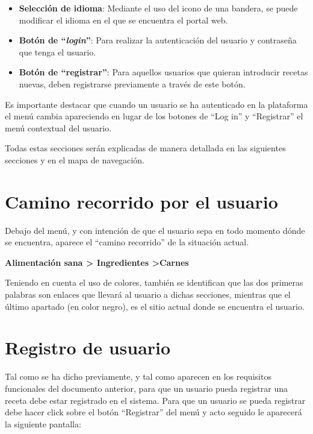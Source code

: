 \documentclass{\ClassPath/viu-tfm-template}
\begin{document}
\begin{itemize}
    \item \textbf{Selección de idioma}: Mediante el uso del icono de una bandera, se puede modificar el idioma en el que se encuentra el portal web.

    \item \textbf{Botón de “\textit{login}”}: Para realizar la autenticación del usuario y contraseña que tenga el usuario.

    \item \textbf{Botón de “registrar”}: Para aquellos usuarios que quieran introducir recetas nuevas, deben registrarse previamente a través de este botón.
    \vspace{-1em}
\end{itemize}

Es importante destacar que cuando un usuario se ha autenticado en la plataforma el menú cambia apareciendo en lugar de los botones de “Log in” y “Registrar” el menú contextual del usuario.

Todas estas secciones serán explicadas de manera detallada en las siguientes secciones y en el mapa de navegación.

\section{Camino recorrido por el usuario}

Debajo del menú, y con intención de que el usuario sepa en todo momento dónde se encuentra, aparece el “camino recorrido” de la situación actual.

\begin{center}
    \vspace{-10pt}
    \textbf{\color{maincolor}Alimentación sana > \space Ingredientes \color{black} >\space Carnes}
    \vspace{-15pt}
\end{center}

Teniendo en cuenta el uso de colores, también se identifican que las dos primeras palabras son enlaces que llevará al usuario a dichas secciones, mientras que el último apartado (en color negro), es el sitio actual donde se encuentra el usuario.


\section{Registro de usuario}
Tal como se ha dicho previamente, y tal como aparecen en los requisitos funcionales del documento anterior, para que un usuario pueda registrar una receta debe estar registrado en el sistema. Para que un usuario se pueda registrar debe hacer click sobre el botón “Registrar” del menú y acto seguido le aparecerá la siguiente pantalla:
\end{document}
